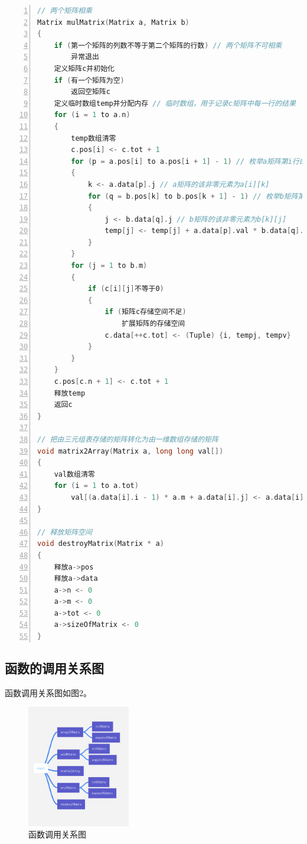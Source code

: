 \documentclass{article}
\begin{document}
\begin{lstlisting}[language={C},
    numbers=left,
    numberstyle=\tiny\consolas,
    basicstyle=\small\consolas]
// 两个矩阵相乘
Matrix mulMatrix(Matrix a, Matrix b)
{
    if (第一个矩阵的列数不等于第二个矩阵的行数) // 两个矩阵不可相乘
        异常退出
    定义矩阵c并初始化
    if (有一个矩阵为空)
        返回空矩阵c
    定义临时数组temp并分配内存 // 临时数组，用于记录c矩阵中每一行的结果
    for (i = 1 to a.n)
    {
        temp数组清零
        c.pos[i] <- c.tot + 1
        for (p = a.pos[i] to a.pos[i + 1] - 1) // 枚举a矩阵第i行的非零元素
        {
            k <- a.data[p].j // a矩阵的该非零元素为a[i][k]
            for (q = b.pos[k] to b.pos[k + 1] - 1) // 枚举b矩阵第k行的非零元素
            {
                j <- b.data[q].j // b矩阵的该非零元素为b[k][j]
                temp[j] <- temp[j] + a.data[p].val * b.data[q].val
            }
        }
        for (j = 1 to b.m)
        {
            if (c[i][j]不等于0) 
            {
                if (矩阵c存储空间不足)
                    扩展矩阵的存储空间
                c.data[++c.tot] <- (Tuple) {i, tempj, tempv}
            }
        }
    }
    c.pos[c.n + 1] <- c.tot + 1
    释放temp
    返回c
}

// 把由三元组表存储的矩阵转化为由一维数组存储的矩阵
void matrix2Array(Matrix a, long long val[])
{
    val数组清零
    for (i = 1 to a.tot)
        val[(a.data[i].i - 1) * a.m + a.data[i].j] <- a.data[i].val; // a[i][j]存储在val[(i-1]*m+j]中
}

// 释放矩阵空间
void destroyMatrix(Matrix * a)
{
    释放a->pos
    释放a->data
    a->n <- 0
    a->m <- 0
    a->tot <- 0
    a->sizeOfMatrix <- 0
}
\end{lstlisting}

\subsection{函数的调用关系图}

函数调用关系图如图2。

\begin{figure}[htbp]

    \centering\includegraphics[width=0.4\textwidth]{./Images/pic3_2.png}

    \caption{函数调用关系图}

\end{figure}
\end{document}
